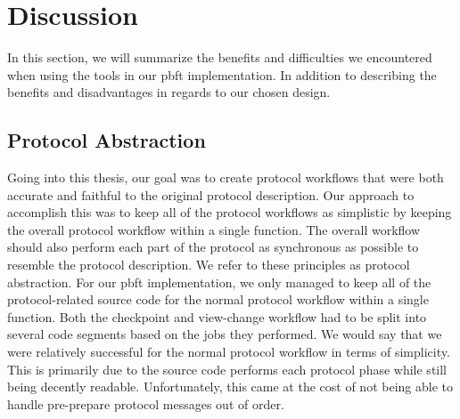 \chapter{Discussion}
\label{chapter:Dis}
In this section, we will summarize the benefits and difficulties we encountered when using the tools in our \ac{pbft} implementation. In addition to describing the benefits and disadvantages in regards to our chosen design.

\section{Protocol Abstraction}

Going into this thesis, our goal was to create protocol workflows that were both accurate and faithful to the original protocol description. Our approach to accomplish this was to keep all of the protocol workflows as simplistic by keeping the overall protocol workflow within a single function. The overall workflow should also perform each part of the protocol as synchronous as possible to resemble the protocol description. We refer to these principles as protocol abstraction. For our \ac{pbft} implementation, we only managed to keep all of the protocol-related source code for the normal protocol workflow within a single function. Both the checkpoint and view-change workflow had to be split into several code segments based on the jobs they performed. We would say that we were relatively successful for the normal protocol workflow in terms of simplicity. This is primarily due to the source code performs each protocol phase while still being decently readable. Unfortunately, this came at the cost of not being able to handle pre-prepare protocol messages out of order.

